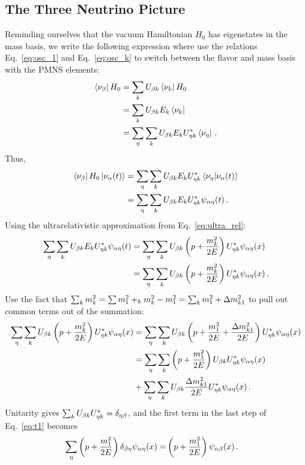 \subsection{The Three Neutrino Picture}
Reminding ourselves that the vacuum Hamiltonian $H_0$ has eigenstates in the mass basis, we write the following expression where 
use the relations Eq.~\ref{eq:osc_1} and Eq.~\ref{eq:osc_k} to switch between the flavor and mass basis with the PMNS elements:
\begin{align}
    \bra{\nu_\beta} H_0 &= \sum_k U_{\beta k} \bra{\nu_k}H_0 \nonumber \\
                     &= \sum_k U_{\beta k} E_k \bra{\nu_k} \nonumber \\
                     &= \sum_\eta \sum_k U_{\beta k} E_k U^*_{\eta k} \bra{\nu_\eta}\,.
\end{align}
Thus,
\begin{align}
    \bra{\nu_\beta}H_0\ket{\nu_\alpha (t)} &= \sum_\eta \sum_k U_{\beta k} E_k U^*_{\eta k} \bra{\nu_\eta}\ket{\nu_\alpha (t)} \nonumber \\
                                    &= \sum_\eta \sum_k U_{\beta k} E_k U^*_{\eta k} \psi_{\alpha\eta}(t)\,.
\end{align}
Using the ultrarelativistic approximation from Eq.~\ref{eq:ultra_rel}:
\begin{align}
    \sum_\eta \sum_k U_{\beta k} E_k U^*_{\eta k} \psi_{\alpha\eta}(t) &= \sum_\eta \sum_k U_{\beta k} \left(p + \frac{m^2_k}{2E}\right) U^*_{\eta k} \psi_{\alpha\eta}(x) \nonumber \\
    &= \sum_\eta \sum_k U_{\beta k} \left(p + \frac{m^2_k}{2E}\right) U^*_{\eta k} \psi_{\alpha\eta}(x)\,.
\end{align}
Use the fact that $\sum_k m_k^2 =  \sum m_1^2 +_k m^2_k - m^2_1 =\sum_k m_1^2 +  \dm_{k1}$ to pull out common terms out of the summation:
\begin{align}\label{eq:t1}
    \sum_\eta \sum_k U_{\b k} \left(p + \frac{m^2_k}{2E}\right) U^*_{\eta k} \psi_{\a\eta}(x) &= \sum_\eta \sum_k U_{\b k} \left(p + \frac{m^2_1}{2E} + \frac{\dm_{k1}}{2E}\right) U^*_{\eta k} \psi_{\a\eta}(x) \nonumber \\
    &= \sum_\eta\sum_k \left(p + \frac{m^2_1}{2E}\right) U_{\b k} U^*_{\eta k} \psi_{\a\eta}(x) \nonumber \\
    &+ \sum_\eta\sum_k U_{\b k} \frac{\dm_{k1}}{2E} U^*_{\eta k} \psi_{\a\eta}(x)\,.
\end{align}
Unitarity gives $ \sum_k U_{\beta k} U^*_{\eta k} = \delta_{\eta\beta}$, and the first term in the last step of Eq.~\ref{eq:t1} becomes
\begin{align}
    \sum_\eta \left(p + \frac{m^2_1}{2E}\right) \delta_{\beta \eta} \psi_{\alpha\eta}(x)
    =& \left(p + \frac{m^2_1}{2E}\right) \psi_{\alpha\beta}(x)\,.
\end{align}

